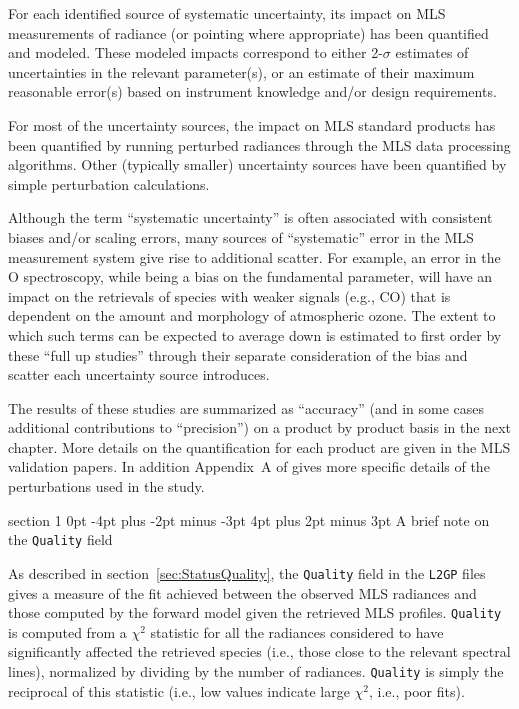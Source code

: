 \documentclass[11pt,draft]{report}
\makeatletter
\renewcommand{\section}{\@startsection%
  {section}%
  {1}%
  {0pt}%
  {-4pt plus -2pt minus -3pt}%
  {4pt plus 2pt minus 3pt}%
  {\Large\sffamily\fontseries{sb}\selectfont\flushleft\color{SectionColor}\figureversion{tabular}}}%
\makeatother
\begin{document}
For each identified source of systematic uncertainty, its impact on MLS
measurements of radiance (or pointing where appropriate) has been
quantified and modeled.  These modeled impacts correspond to either
2-$\sigma$ estimates of uncertainties in the relevant parameter(s), or
an estimate of their maximum reasonable error(s) based on instrument
knowledge and/or design requirements.

For most of the uncertainty sources, the impact on MLS standard products
has been quantified by running perturbed radiances through the MLS data
processing algorithms.  Other (typically smaller) uncertainty sources
have been quantified by simple perturbation calculations.

Although the term ``systematic uncertainty'' is often associated with
consistent biases and/or scaling errors, many sources of ``systematic''
error in the MLS measurement system give rise to additional scatter.
For example, an error in the O spectroscopy, while being a bias on
the fundamental parameter, will have an impact on the retrievals of
species with weaker signals (e.g., CO) that is dependent on the amount
and morphology of atmospheric ozone.  The extent to which such terms can
be expected to average down is estimated to first order by these ``full
up studies'' through their separate consideration of the bias and scatter
each uncertainty source introduces.

The results of these studies are summarized as ``accuracy'' (and in some
cases additional contributions to ``precision'') on a product by product
basis in the next chapter.  More details on the quantification for each
product are given in the MLS validation papers.  In addition Appendix~A
of \citet{ReadEtal07} gives more specific details of the perturbations
used in the study.

\section{A brief note on the \texttt{Quality} field}

As described in section~\ref{sec:StatusQuality}, the \texttt{Quality}
field in the \texttt{L2GP} files gives a measure of the fit achieved
between the observed MLS radiances and those computed by the forward
model given the retrieved MLS profiles.  \texttt{Quality} is computed
from a $\chi^2$ statistic for all the radiances considered to have
significantly affected the retrieved species (i.e., those close to the
relevant spectral lines), normalized by dividing by the number of
radiances.  \texttt{Quality} is simply the reciprocal of this statistic
(i.e., low values indicate large $\chi^2$, i.e., poor fits).
\end{document}
